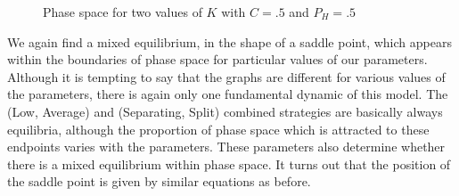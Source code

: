 \documentclass[a4paper,10pt]{article}
\numberwithin{equation}{section}
\begin{document}
\begin{figure}[h]
\begin{center}
\hfill
{}
\end{center}
\caption{Phase space for two values of $K$ with $C=.5$ and $P_H=.5$}
\label{fig:Graph16.png and fig:Graph17.png}
\end{figure}

We again find a mixed equilibrium, in the shape of a saddle point, which appears within the boundaries of phase space for particular values of our parameters. Although it is tempting to say that the graphs are different for various values of the parameters, there is again only one fundamental dynamic of this model. The (Low, Average) and (Separating, Split) combined strategies are basically always equilibria, although the proportion of phase space which is attracted to these endpoints varies with the parameters. These parameters also determine whether there is a mixed equilibrium within phase space. It turns out that the position of the saddle point is given by similar equations as before.
\end{document}
